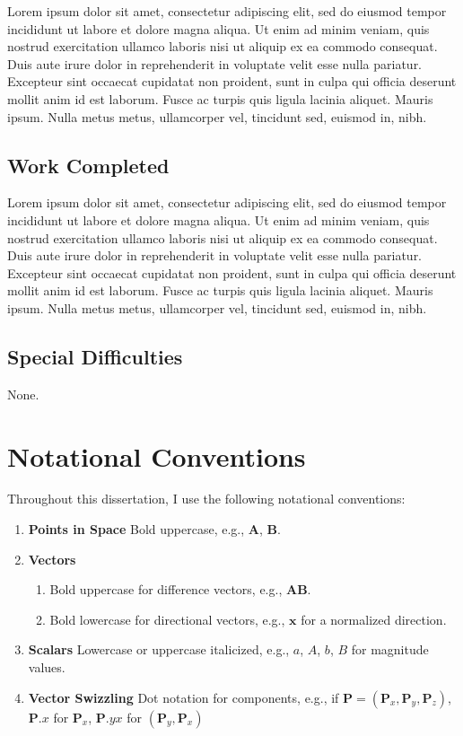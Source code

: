 \documentclass[12pt,a4paper,twoside,openright]{report}
\begin{document}
Lorem ipsum dolor sit amet, consectetur adipiscing elit, sed do eiusmod tempor incididunt ut labore et dolore magna aliqua. Ut enim ad minim veniam, quis nostrud exercitation ullamco laboris nisi ut aliquip ex ea commodo consequat. Duis aute irure dolor in reprehenderit in voluptate velit esse nulla pariatur. Excepteur sint occaecat cupidatat non proident, sunt in culpa qui officia deserunt mollit anim id est laborum.
Fusce ac turpis quis ligula lacinia aliquet. Mauris ipsum. Nulla metus metus, ullamcorper vel, tincidunt sed, euismod in, nibh.

\section*{Work Completed}

Lorem ipsum dolor sit amet, consectetur adipiscing elit, sed do eiusmod tempor incididunt ut labore et dolore magna aliqua. Ut enim ad minim veniam, quis nostrud exercitation ullamco laboris nisi ut aliquip ex ea commodo consequat. Duis aute irure dolor in reprehenderit in voluptate velit esse nulla pariatur. Excepteur sint occaecat cupidatat non proident, sunt in culpa qui officia deserunt mollit anim id est laborum.
Fusce ac turpis quis ligula lacinia aliquet. Mauris ipsum. Nulla metus metus, ullamcorper vel, tincidunt sed, euismod in, nibh.

\section*{Special Difficulties}

None.

\newpage 

\chapter*{Notational Conventions}

Throughout this dissertation, I use the following notational conventions:

\begin{enumerate}
    \item \textbf{Points in Space} Bold uppercase, e.g., $\mathbf{A}$, $\mathbf{B}$.
    \item \textbf{Vectors} 
        \begin{enumerate}
	\item Bold uppercase for difference vectors, e.g., $\mathbf{AB}$.
	\item Bold lowercase for directional vectors, e.g., $\mathbf{x}$ for a normalized direction.
        \end{enumerate}
    \item \textbf{Scalars} Lowercase or uppercase italicized, e.g., $a$, $A$, $b$, $B$ for magnitude values.
    \item \textbf{Vector Swizzling} Dot notation for components, e.g., if $\mathbf{P}=(\mathbf{P}_x,\mathbf{P}_y,\mathbf{P}_z)$, $\mathbf{P}.x$ for $\mathbf{P}_x$, $\mathbf{P}.yx$ for $(\mathbf{P}_{y}, \mathbf{P}_x)$
\end{enumerate}
\end{document}
